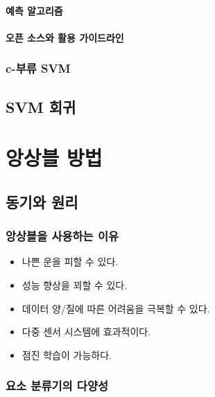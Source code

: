 \documentclass [12pt] {oblivoir}
\let\oldsubsubsection=\subsubsection
\renewcommand{\subsubsection}
{
  \filbreak
  \oldsubsubsection
}
\begin{document}
\vspace{3mm}

\paragraph*{예측 알고리즘}\mbox{}

\vspace{3mm}

\paragraph*{오픈 소스와 활용 가이드라인}\mbox{}

\vspace{3mm}

\subsubsection{c-부류 SVM}

\subsection{SVM 회귀}

\newpage
\section{앙상블 방법}

\subsection{동기와 원리}

\subsubsection{앙상블을 사용하는 이유}

\begin{itemize}
  \item 나쁜 운을 피할 수 있다.
  \item 성능 향상을 꾀할 수 있다.
  \item 데이터 양/질에 따른 어려움을 극복할 수 있다.
  \item 다중 센서 시스템에 효과적이다.
  \item 점진 학습이 가능하다.
\end{itemize}

\subsubsection{요소 분류기의 다양성}
\end{document}
